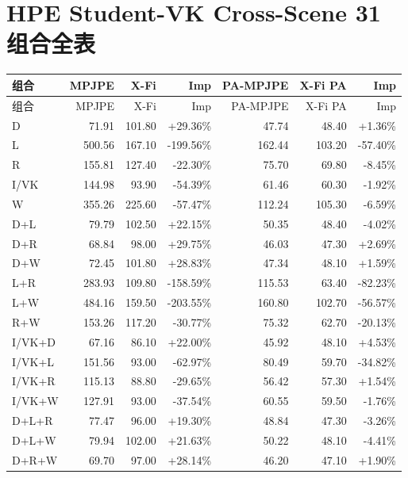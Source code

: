 \documentclass[UTF8,10pt]{ctexart}
\newcommand{\better}[1]{\textcolor{goodblue}{#1}}
\newcommand{\worse}[1]{\textcolor{badred}{#1}}
\begin{document}
\section{HPE Student-VK Cross-Scene 31 组合全表}
{\tiny
\begin{longtable}{lrrrrrr}
\toprule
组合 & MPJPE & X-Fi & Imp & PA-MPJPE & X-Fi PA & Imp\\
\midrule
\endfirsthead
\toprule
组合 & MPJPE & X-Fi & Imp & PA-MPJPE & X-Fi PA & Imp\\
\midrule
\endhead
D & 71.91 & 101.80 & \better{+29.36\%} & 47.74 & 48.40 & \better{+1.36\%}\\
L & 500.56 & 167.10 & \worse{-199.56\%} & 162.44 & 103.20 & \worse{-57.40\%}\\
R & 155.81 & 127.40 & \worse{-22.30\%} & 75.70 & 69.80 & \worse{-8.45\%}\\
I/VK & 144.98 & 93.90 & \worse{-54.39\%} & 61.46 & 60.30 & \worse{-1.92\%}\\
W & 355.26 & 225.60 & \worse{-57.47\%} & 112.24 & 105.30 & \worse{-6.59\%}\\
D+L & 79.79 & 102.50 & \better{+22.15\%} & 50.35 & 48.40 & \worse{-4.02\%}\\
D+R & 68.84 & 98.00 & \better{+29.75\%} & 46.03 & 47.30 & \better{+2.69\%}\\
D+W & 72.45 & 101.80 & \better{+28.83\%} & 47.34 & 48.10 & \better{+1.59\%}\\
L+R & 283.93 & 109.80 & \worse{-158.59\%} & 115.53 & 63.40 & \worse{-82.23\%}\\
L+W & 484.16 & 159.50 & \worse{-203.55\%} & 160.80 & 102.70 & \worse{-56.57\%}\\
R+W & 153.26 & 117.20 & \worse{-30.77\%} & 75.32 & 62.70 & \worse{-20.13\%}\\
I/VK+D & 67.16 & 86.10 & \better{+22.00\%} & 45.92 & 48.10 & \better{+4.53\%}\\
I/VK+L & 151.56 & 93.00 & \worse{-62.97\%} & 80.49 & 59.70 & \worse{-34.82\%}\\
I/VK+R & 115.13 & 88.80 & \worse{-29.65\%} & 56.42 & 57.30 & \better{+1.54\%}\\
I/VK+W & 127.91 & 93.00 & \worse{-37.54\%} & 60.55 & 59.50 & \worse{-1.76\%}\\
D+L+R & 77.47 & 96.00 & \better{+19.30\%} & 48.84 & 47.30 & \worse{-3.26\%}\\
D+L+W & 79.94 & 102.00 & \better{+21.63\%} & 50.22 & 48.10 & \worse{-4.41\%}\\
D+R+W & 69.70 & 97.00 & \better{+28.14\%} & 46.20 & 47.10 & \better{+1.90\%}\\

\end{longtable}}
\end{document}
